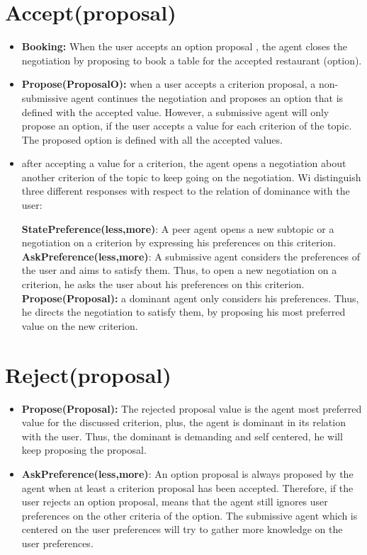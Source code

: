 \documentclass{llncs}
\begin{document}
\section{Accept(proposal)}
\begin{itemize}
\item \textbf{Booking: } When the user accepts an option proposal , the agent closes the negotiation by proposing to book a table for the accepted restaurant (option).

\item \textbf{Propose(ProposalO):} when a user accepts a criterion proposal, a non-submissive agent continues the negotiation and proposes an option that is defined with the accepted value. However, a submissive agent will only propose an option, if the user accepts a value for each criterion of the topic.  The proposed option is defined with all the accepted values.
\item after accepting a value for a criterion, the agent opens a negotiation about another criterion of the topic to keep going on the negotiation. Wi distinguish three different responses with respect to the relation of dominance with the user:

	\subitem \textbf{StatePreference(less,more)}:  A peer agent opens a new subtopic or a negotiation on a criterion by expressing his preferences on this criterion.
	\subitem \textbf{AskPreference(less,more)}:  A submissive agent considers the preferences of the user and aims to satisfy them. Thus, to open a new negotiation on a criterion, he asks the user about his preferences on this criterion.
	\subitem \textbf{Propose(Proposal):} a dominant agent only considers his preferences. Thus, he directs the negotiation to satisfy them, by proposing his most preferred value on the new criterion. 
\end{itemize}
\section{Reject(proposal)}
\begin{itemize}
	\item \textbf{Propose(Proposal):} The rejected proposal value is the agent most preferred value for the discussed criterion, plus, the agent is dominant in its relation with the user. Thus, the dominant is demanding and self centered, he will keep proposing the proposal.
	\item \textbf{AskPreference(less,more)}: An option proposal is always proposed by the agent when at least a criterion proposal has been accepted. Therefore, if the user rejects an option proposal, means that the agent still ignores user preferences on the other criteria of the option. The submissive agent which is centered on the user preferences will try to gather more knowledge on the user preferences. 
	
\end{itemize}
\end{document}
